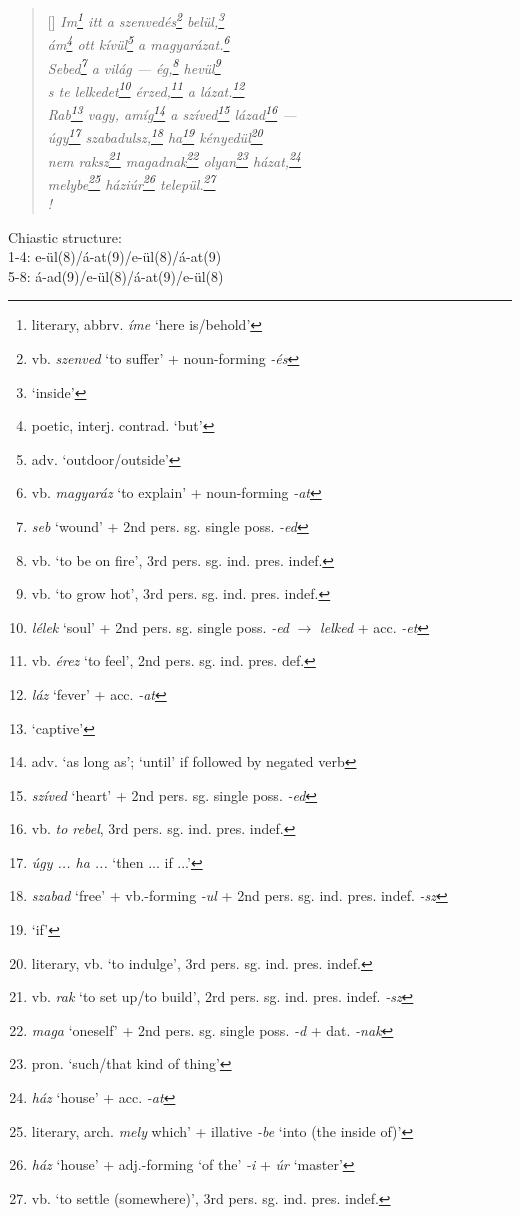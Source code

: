 \documentclass[a4paper,12pt,twoside,final]{book}
\begin{document}
\begin{verse}[\versewidth]
  \it
  Im\footnote{literary, abbrv. \emph{íme} `here is/behold'}
  itt a szenvedés\footnote{vb. \emph{szenved} `to suffer'
  + noun-forming \emph{-és}} belül,\footnote{`inside'} \\
  ám\footnote{poetic, interj. contrad. `but'} ott
  kívül\footnote{adv. `outdoor/outside'} a
  magyarázat.\footnote{vb. \emph{magyaráz} `to explain' +
  noun-forming \emph{-at}} \\
  Sebed\footnote{\emph{seb} `wound' + 2nd
  pers. sg. single poss. \emph{-ed}} a világ --- ég,\footnote{vb.
  `to be on fire', 3rd pers. sg. ind. pres. indef.}
  hevül\footnote{vb. `to grow hot', 3rd
  pers. sg. ind. pres. indef.} \\
  s te lelkedet\footnote{\emph{lélek} `soul' + 2nd
  pers. sg. single poss. \emph{-ed} $\rightarrow$ \emph{lelked} +
  acc. \emph{-et}} érzed,\footnote{vb. \emph{érez} `to feel', 2nd
  pers. sg. ind. pres. def.} a lázat.\footnote{\emph{láz} `fever' +
  acc. \emph{-at}} \\
  Rab\footnote{`captive'} vagy, amíg\footnote{adv. `as long as';
  `until' if followed by negated verb} a
  szíved\footnote{\emph{szíved} `heart' + 2nd pers. sg. single
  poss. \emph{-ed}} lázad\footnote{vb. \emph{to rebel}, 3rd
  pers. sg. ind. pres. indef.} --- \\
  úgy\footnote{\emph{úgy ... ha ...} `then ... if ...'}
  szabadulsz,\footnote{\emph{szabad} `free' + vb.-forming \emph{-ul}
  + 2nd pers. sg. ind. pres. indef. \emph{-sz}} ha\footnote{`if'}
  kényedül\footnote{literary, vb. `to indulge', 3rd
  pers. sg. ind. pres. indef.} \\
  nem raksz\footnote{vb. \emph{rak} `to set up/to build', 2rd
  pers. sg. ind. pres. indef. \emph{-sz}}
  magadnak\footnote{\emph{maga} `oneself' + 2nd pers. sg. single
  poss. \emph{-d} + dat. \emph{-nak}}
  olyan\footnote{pron. `such/that kind of thing'}
  házat,\footnote{\emph{ház} `house' + acc. \emph{-at}} \\
  melybe\footnote{literary, arch. \emph{mely}
   which' + illative \emph{-be} `into (the inside of)'}
  háziúr\footnote{\emph{ház} `house' + adj.-forming `of the'
  \emph{-i} + \emph{úr} `master'} települ.\footnote{vb. `to
  settle (somewhere)', 3rd pers. sg. ind. pres. indef.} \\!
\end{verse}

\noindent Chiastic structure: \\
1-4: e-ül(8)/á-at(9)/e-ül(8)/á-at(9) \\
5-8: á-ad(9)/e-ül(8)/á-at(9)/e-ül(8)
\end{document}

